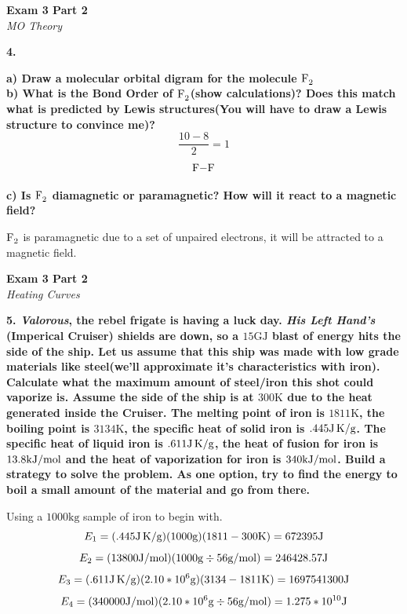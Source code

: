 \documentclass{article}
\begin{document}
    \begin{center}
        \textbf{Exam 3 Part 2}\\
        \textit{MO Theory}
    \end{center}
    \textbf{4.}

    \textbf{a) Draw a molecular orbital digram for the molecule $\ce{F2}$}\\[2cm]

    \textbf{b) What is the Bond Order of $\ce{F2}$(show calculations)? Does this match what is predicted by Lewis structures(You will have to draw a Lewis structure to convince me)?}
    $$ \dfrac{10 - 8}{2} = 1$$
    $$ \ce{F-F}$$

    \textbf{c) Is $\ce{F2}$ diamagnetic or paramagnetic? How will it react to a magnetic field?}

    $\ce{F2}$ is paramagnetic due to a set of  unpaired electrons, it will be attracted to a magnetic field.
    \pagebreak

    \begin{center}
        \textbf{Exam 3 Part 2}\\
        \textit{Heating Curves}
    \end{center}
    \textbf{5. \textit{Valorous}, the rebel frigate is having a luck day. \textit{His Left Hand's} (Imperical Cruiser) shields are down, so a $15 \si{\giga\joule}$ blast of energy hits the side of the ship. Let us assume that this ship was made with low grade materials like steel(we'll approximate it's characteristics with iron). Calculate what the maximum amount of steel/iron this shot could vaporize is. Assume the side of the ship is at $300 \si{\kelvin}$ due to the heat generated inside the Cruiser. The melting point of iron is $1811 \si{\kelvin}$, the boiling point is $3134 \si{\kelvin}$, the specific heat of solid iron is $.445 \si[per-mode=symbol]{\joule\per\gram\kelvin}$. The specific heat of liquid iron is $.611 \si[per-mode=symbol]{\joule\per\gram\kelvin}$, the heat of fusion for iron is $13.8 \si[per-mode=symbol]{\kilo\joule\per\mole}$ and the heat of vaporization for iron is $340 \si[per-mode=symbol]{\kilo\joule\per\mole}$. Build a strategy to solve the problem. As one option, try to find the energy to boil a small amount of the material and go from there.}

    Using a $1000 \si{\kilo\gram}$ sample of iron to begin with.
    $$E_{1} = (.445 \si[per-mode=symbol]{\joule\per\gram\kelvin})(1000 \si{\gram})(1811 - 300 \si{\kelvin})  = 672395 \si{\joule}$$
    $$E_{2} = (13800 \si[per-mode=symbol]{\joule\per\mole})(1000 \si{\gram} \div 56 \si[per-mode=symbol]{\gram\per\mole}) = 246428.57 \si{\joule}$$
    $$E_{3} = (.611 \si[per-mode=symbol]{\joule\per\gram\kelvin})( 2.10 * 10^{6} \si{\gram})(3134 - 1811 \si{\kelvin})  = 1697541300 \si{\joule}$$
    $$E_{4} = (340000 \si[per-mode=symbol]{\joule\per\mole})(2.10 * 10^{6} \si{\gram} \div 56 \si[per-mode=symbol]{\gram\per\mole}) = 1.275 * 10^{10} \si{\joule}$$
\end{document}
